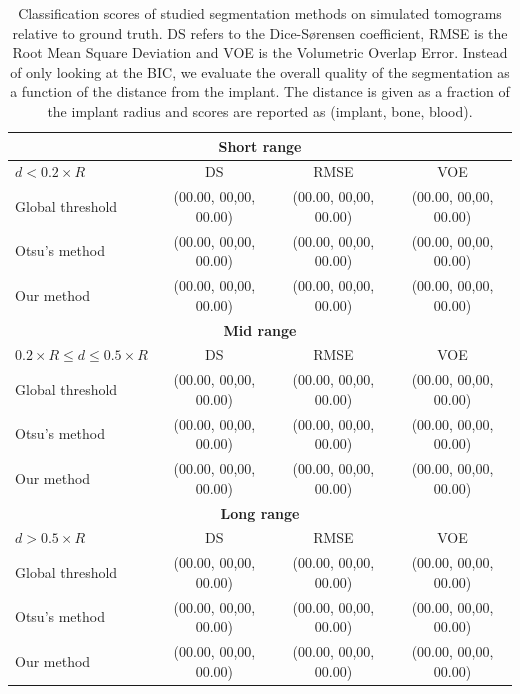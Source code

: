 \begin{table}[]
\caption{
	Classification scores of studied segmentation methods on simulated
	tomograms relative to ground truth. DS refers to the Dice-Sørensen
	coefficient, RMSE is the Root Mean Square Deviation and VOE is the
	Volumetric Overlap Error. Instead of only looking at the BIC, we
	evaluate the overall quality of the segmentation as a function of the
	distance from the implant. The distance is given as a fraction of the
	implant radius and scores are reported as (implant, bone, blood).
        }
\label{tab:scores}
\centering
\begin{tabular}{lccc}
\bottomrule
\multicolumn{4}{c}{\textbf{Short range}} \\
\toprule
$d < 0.2 \times R$ & DS & RMSE & VOE \\
\midrule
Global threshold & (00.00, 00,00, 00.00) & (00.00, 00,00, 00.00) & (00.00, 00,00, 00.00) \\
Otsu's method    & (00.00, 00,00, 00.00) & (00.00, 00,00, 00.00) & (00.00, 00,00, 00.00) \\
Our method       & (00.00, 00,00, 00.00) & (00.00, 00,00, 00.00) & (00.00, 00,00, 00.00) \\
\bottomrule
\multicolumn{4}{c}{\textbf{Mid range}} \\
\toprule
$ 0.2 \times R \leq d \leq 0.5 \times R$ & DS & RMSE & VOE \\
\midrule
Global threshold & (00.00, 00,00, 00.00) & (00.00, 00,00, 00.00) & (00.00, 00,00, 00.00) \\
Otsu's method    & (00.00, 00,00, 00.00) & (00.00, 00,00, 00.00) & (00.00, 00,00, 00.00) \\
Our method       & (00.00, 00,00, 00.00) & (00.00, 00,00, 00.00) & (00.00, 00,00, 00.00) \\
\bottomrule
\multicolumn{4}{c}{\textbf{Long range}} \\
\toprule
$d > 0.5 \times R$   & DS & RMSE & VOE \\
\midrule
Global threshold & (00.00, 00,00, 00.00) & (00.00, 00,00, 00.00) & (00.00, 00,00, 00.00) \\
Otsu's method    & (00.00, 00,00, 00.00) & (00.00, 00,00, 00.00) & (00.00, 00,00, 00.00) \\
Our method       & (00.00, 00,00, 00.00) & (00.00, 00,00, 00.00) & (00.00, 00,00, 00.00) \\
\bottomrule
\end{tabular}
\end{table}

